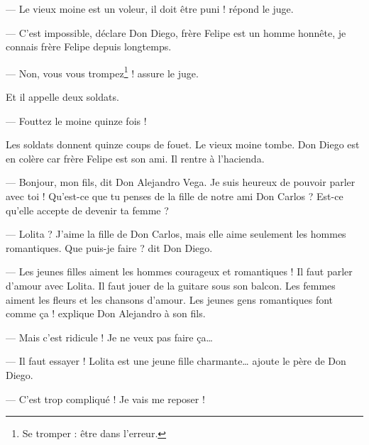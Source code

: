 --- Le vieux moine est un voleur, il doit être puni ! répond le juge.

--- C'est impossible, déclare Don Diego, frère Felipe est un homme honnête, je connais frère Felipe depuis longtemps.

--- Non, vous vous trompez\footnote{Se tromper : être dans l'erreur.} ! assure le juge.

Et il appelle deux soldats.

--- Fouttez le moine quinze fois !

Les soldats donnent quinze coups de fouet. Le vieux moine tombe. Don Diego est en colère car frère Felipe est son ami. Il rentre à
l'hacienda.

--- Bonjour, mon fils, dit Don Alejandro Vega. Je suis heureux de pouvoir parler avec toi ! Qu'est-ce que tu penses de la fille de
    notre ami Don Carlos ? Est-ce qu'elle accepte de devenir ta femme ?

--- Lolita ? J'aime la fille de Don Carlos, mais elle aime seulement les hommes romantiques. Que puis-je faire ? dit Don Diego.

--- Les jeunes filles aiment les hommes courageux et romantiques ! Il faut parler d'amour avec Lolita. Il faut jouer de la guitare
sous son balcon. Les femmes aiment les fleurs et les chansons d'amour. Les jeunes gens romantiques font comme ça ! explique Don
Alejandro à son fils.

--- Mais c'est ridicule ! Je ne veux pas faire ça\ldots{}

--- Il faut essayer ! Lolita est une jeune fille charmante\ldots{} ajoute le père de Don Diego.

--- C'est trop compliqué ! Je vais me reposer !
